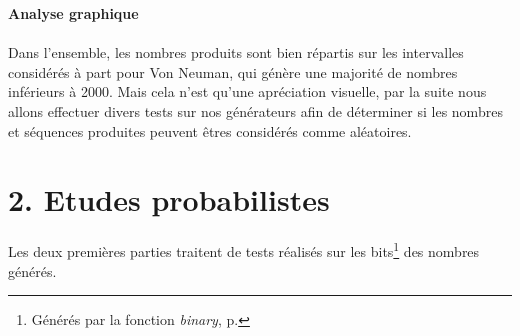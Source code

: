 \documentclass[
]{article}
\begin{document}
\textbf{Analyse graphique}

\paragraph{}

Dans l'ensemble, les nombres produits sont bien répartis sur les
intervalles considérés à part pour Von Neuman, qui génère une majorité
de nombres inférieurs à 2000. Mais cela n'est qu'une apréciation
visuelle, par la suite nous allons effectuer divers tests sur nos
générateurs afin de déterminer si les nombres et séquences produites
peuvent êtres considérés comme aléatoires.

\clearpage
\section*{2. Etudes probabilistes}

Les deux premières parties traitent de tests réalisés sur les
bits\footnote{Générés par la fonction \textit{binary}, p. \pageref{subsec:binary}}
des nombres générés.
\end{document}
